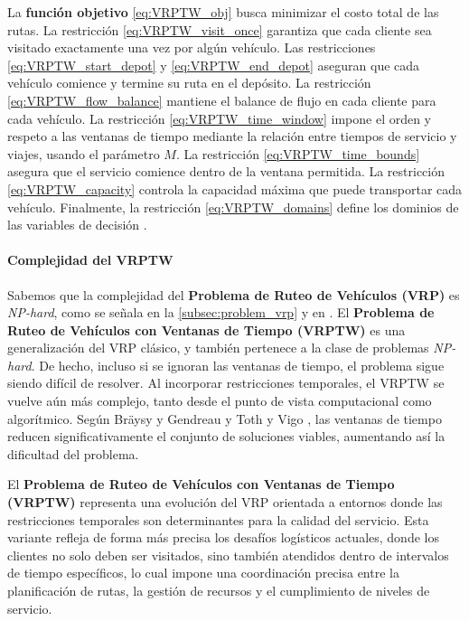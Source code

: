 \documentclass[12pt,titlepage,twoside,openright]{book}
\begin{document}
La \textbf{función objetivo} \eqref{eq:VRPTW_obj} busca minimizar el costo total de las rutas. La restricción \eqref{eq:VRPTW_visit_once} garantiza que cada cliente sea visitado exactamente una vez por algún vehículo. Las restricciones \eqref{eq:VRPTW_start_depot} y \eqref{eq:VRPTW_end_depot} aseguran que cada vehículo comience y termine su ruta en el depósito. La restricción \eqref{eq:VRPTW_flow_balance} mantiene el balance de flujo en cada cliente para cada vehículo. La restricción \eqref{eq:VRPTW_time_window} impone el orden y respeto a las ventanas de tiempo mediante la relación entre tiempos de servicio y viajes, usando el parámetro \(M\). La restricción \eqref{eq:VRPTW_time_bounds} asegura que el servicio comience dentro de la ventana permitida. La restricción \eqref{eq:VRPTW_capacity} controla la capacidad máxima que puede transportar cada vehículo. Finalmente, la restricción \eqref{eq:VRPTW_domains} define los dominios de las variables de decisión \citep{toth2014}.

\paragraph{Complejidad del VRPTW}

Sabemos que la complejidad del \textbf{Problema de Ruteo de Vehículos (VRP)} es \textit{NP-hard}, como se señala en la \autoref{subsec:problem_vrp} y en \citep{laporte1987}. El \textbf{Problema de Ruteo de Vehículos con Ventanas de Tiempo (VRPTW)} es una generalización del VRP clásico, y también pertenece a la clase de problemas \textit{NP-hard}. De hecho, incluso si se ignoran las ventanas de tiempo, el problema sigue siendo difícil de resolver. Al incorporar restricciones temporales, el VRPTW se vuelve aún más complejo, tanto desde el punto de vista computacional como algorítmico. Según Bräysy y Gendreau \citep{braysy2005} y Toth y Vigo \citep{toth2014}, las ventanas de tiempo reducen significativamente el conjunto de soluciones viables, aumentando así la dificultad del problema.


El \textbf{Problema de Ruteo de Vehículos con Ventanas de Tiempo (VRPTW)} representa una evolución del VRP orientada a entornos donde las restricciones temporales son determinantes para la calidad del servicio. Esta variante refleja de forma más precisa los desafíos logísticos actuales, donde los clientes no solo deben ser visitados, sino también atendidos dentro de intervalos de tiempo específicos, lo cual impone una coordinación precisa entre la planificación de rutas, la gestión de recursos y el cumplimiento de niveles de servicio.
\end{document}
